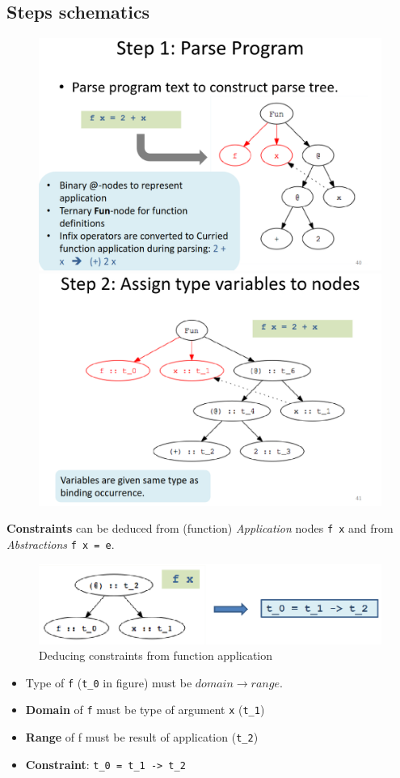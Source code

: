 \subsection{Steps schematics}
\begin{figure}[htbp]
   \centering
   \includegraphics[width=0.4\columnwidth]{images/typeinference_step1.png}
   \includegraphics[width=0.4\columnwidth]{images/typeinference_step2.png}
   \label{fig:typeinference_step1_2}
\end{figure}


\textbf{Constraints} can be deduced from (function) \textit{Application} nodes \lstinline|f x| and from \textit{Abstractions} \lstinline|f x = e|.

\begin{figure}[htbp]
   \centering
   \includegraphics{images/typeinference_constraints_application.png}
   \caption{Deducing constraints from function application}
   \label{fig:typeinference_constraints_application}
\end{figure}
\begin{itemize}
   \item Type of \lstinline|f| (\lstinline|t_0| in figure) must be $domain \longrightarrow range$.
   \item \textbf{Domain} of \lstinline|f| must be type of argument \lstinline|x| (\lstinline|t_1|)
   \item \textbf{Range} of f must be result of application (\lstinline|t_2|)
   \item \textbf{Constraint}: \lstinline|t_0 = t_1 -> t_2|
\end{itemize}


